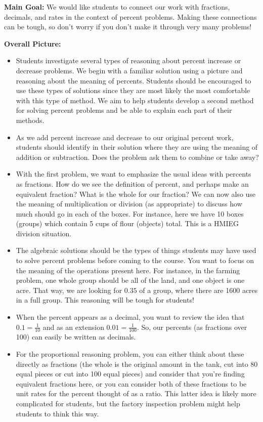 \documentclass[noauthor,nooutcomes, handout]{ximera}
\begin{document}
\begin{instructorNotes}
{\bf Main Goal:} We would like students to connect our work with fractions, decimals, and rates in the context of percent problems. Making these connections can be tough, so don't worry if you don't make it through very many problems!

{\bf Overall Picture:}
\begin{itemize}
	\item Students investigate several types of reasoning about percent increase or decrease problems. We begin with a familiar solution using a picture and reasoning about the meaning of percents. Students should be encouraged to use these types of solutions since they are most likely the most comfortable with this type of method. We aim to help students develop a second method for solving percent problems and be able to explain each part of their methods.
	\item As we add percent increase and decrease to our original percent work, students should identify in their solution where they are using the meaning of addition or subtraction. Does the problem ask them to combine or take away?
	\item With the first problem, we want to emphasize the usual ideas with percents as fractions. How do we see the definition of percent, and perhaps make an equivalent fraction? What is the whole for our fraction? We can now also use the meaning of multiplication or division (as appropriate) to discuss how much should go in each of the boxes. For instance, here we have 10 boxes (groups) which contain 5 cups of flour (objects) total. This is a HMIEG division situation.
	\item The algebraic solutions should be the types of things students may have used to solve percent problems before coming to the course. You want to focus on the meaning of the operations present here. For instance, in the farming problem, one whole group should be all of the land, and one object is one acre. That way, we are looking for $0.35$ of a group, where there are 1600 acres in a full group. This reasoning will be tough for students!
	\item When the percent appears as a decimal, you want to review the idea that $0.1 = \frac{1}{10}$ and as an extension $0.01 = \frac{1}{100}$. So, our percents (as fractions over 100) can easily be written as decimals.
	\item For the proportional reasoning problem, you can either think about these directly as fractions (the whole is the original amount in the tank, cut into 80 equal pieces or cut into 100 equal pieces) and consider that you're finding equivalent fractions here, or you can consider both of these fractions to be unit rates for the percent thought of as a ratio. This latter idea is likely more complicated for students, but the factory inspection problem might help students to think this way.

\end{itemize}
\end{instructorNotes}
\end{document}

